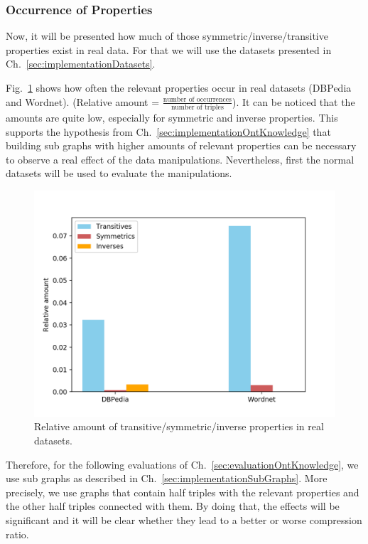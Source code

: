 \subsubsection{Occurrence of Properties}
Now, it will be presented how much of those symmetric/inverse/transitive properties exist in real data. For that we will use the datasets presented in Ch.~\ref{sec:implementationDatasets}. 

Fig.~\ref{fig:ontoccurrences} shows how often the relevant properties occur in real datasets (DBPedia and Wordnet). (Relative amount = $\frac{\text{number of occurrences}}{\text{number of triples}}$). It can be noticed that the amounts are quite low, especially for symmetric and inverse properties. This supports the hypothesis from Ch.~\ref{sec:implementationOntKnowledge} that building sub graphs with higher amounts of relevant properties can be necessary to observe a real effect of the data manipulations. Nevertheless, first the normal datasets will be used to evaluate the manipulations.

\begin{figure}
	\centering
	\includegraphics[width=0.7\linewidth]{figures/4_evaluation/ontOccurrences}
	\caption{Relative amount of transitive/symmetric/inverse properties in real datasets.}
	\label{fig:ontoccurrences}
\end{figure}


Therefore, for the following evaluations of Ch.~\ref{sec:evaluationOntKnowledge}, we use sub graphs as described in Ch.~\ref{sec:implementationSubGraphs}. More precisely, we use graphs that contain half triples with the relevant properties and the other half triples connected with them. By doing that, the effects will be significant and it will be clear whether they lead to a better or worse compression ratio. 

